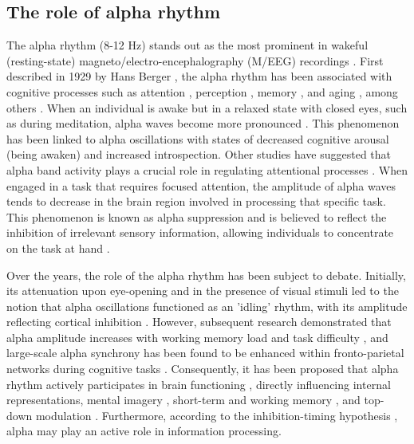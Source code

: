 \documentclass[../main.tex]{subfiles}
\begin{document}
\subsection{The role of alpha rhythm}
The alpha rhythm (8-12 Hz) stands out as the most prominent in wakeful (resting-state) magneto/electro-encephalography (M/EEG) recordings \citep{britton_electroencephalography_2016}.
First described in 1929 by Hans Berger \citep{berger_uber_1934}, the alpha rhythm has been associated with cognitive processes such as attention \citep{klimesch2012alpha}, perception \citep{zhou2021alpha,peng2015subjective}, memory \citep{klimesch1997eeg,halgren2019generation}, and aging \citep{knyazeva2018aging}, among others \citep{shaw2003brain}.
When an individual is awake but in a relaxed state with closed eyes, such as during meditation, alpha waves become more pronounced \citep{lomas_systematic_2015}.
This phenomenon has been linked to alpha oscillations with states of decreased cognitive arousal (being awaken) and increased introspection.
Other studies have suggested that alpha band activity plays a crucial role in regulating attentional processes \citep{klimesch_induced_1998, sauseng_shift_2005, bollimunta_neuronal_2011,compton_task_2014}.
When engaged in a task that requires focused attention, the amplitude of alpha waves tends to decrease in the brain region involved in processing that specific task.
This phenomenon is known as alpha suppression and is believed to reflect the inhibition of irrelevant sensory information, allowing individuals to concentrate on the task at hand \citep{compton_task_2014,poland_reduced_2021,clements_dynamics_2022}.

Over the years, the role of the alpha rhythm has been subject to debate.
Initially, its attenuation upon eye-opening and in the presence of visual stimuli led to the notion that alpha oscillations functioned as an 'idling' rhythm, with its amplitude reflecting cortical inhibition \citep{Cliodhna2022}.
However, subsequent research demonstrated that alpha amplitude increases with working memory load and task difficulty \citep{jensen2002oscillations}, and large-scale alpha synchrony has been found to be enhanced within fronto-parietal networks during cognitive tasks \citep{Sadaghiani14305}.
Consequently, it has been proposed that alpha rhythm actively participates in brain functioning \citep{palva2007new}, directly influencing internal representations, mental imagery \citep{cooper2003paradox}, short-term and working memory \citep{klimesch2007eeg}, and top-down modulation \citep{von2000top}.
Furthermore, according to the inhibition-timing hypothesis \citep{klimesch2007eeg}, alpha may play an active role in information processing.
\end{document}
